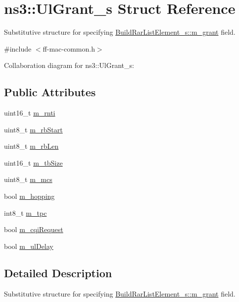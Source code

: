 \hypertarget{structns3_1_1UlGrant__s}{}\section{ns3\+:\+:Ul\+Grant\+\_\+s Struct Reference}
\label{structns3_1_1UlGrant__s}


Substitutive structure for specifying \hyperlink{structns3_1_1BuildRarListElement__s_acd5001d775fe5373d8f5a946faf9eab4}{Build\+Rar\+List\+Element\+\_\+s\+::m\+\_\+grant} field.  




{\ttfamily \#include $<$ff-\/mac-\/common.\+h$>$}



Collaboration diagram for ns3\+:\+:Ul\+Grant\+\_\+s\+:
\subsection*{Public Attributes}
\begin{DoxyCompactItemize}
\item 
uint16\+\_\+t \hyperlink{structns3_1_1UlGrant__s_af84e1341cc3bfe2d93416108b1dce244}{m\+\_\+rnti}
\item 
uint8\+\_\+t \hyperlink{structns3_1_1UlGrant__s_ae1c3bca41e76255179dc453af8db97e4}{m\+\_\+rb\+Start}
\item 
uint8\+\_\+t \hyperlink{structns3_1_1UlGrant__s_ac35c64b333e9d5888d84b0470c7ca23e}{m\+\_\+rb\+Len}
\item 
uint16\+\_\+t \hyperlink{structns3_1_1UlGrant__s_a650f51e5a4548b11974182c895e4c4e4}{m\+\_\+tb\+Size}
\item 
uint8\+\_\+t \hyperlink{structns3_1_1UlGrant__s_acd1128e77e01e05ac5434335d18910de}{m\+\_\+mcs}
\item 
bool \hyperlink{structns3_1_1UlGrant__s_a50d34bde0ad58e8e8858c648fb744e46}{m\+\_\+hopping}
\item 
int8\+\_\+t \hyperlink{structns3_1_1UlGrant__s_a475400b216065aa0e05283ea630d6726}{m\+\_\+tpc}
\item 
bool \hyperlink{structns3_1_1UlGrant__s_a495f2bd48f672718ebdb3ce43df05f56}{m\+\_\+cqi\+Request}
\item 
bool \hyperlink{structns3_1_1UlGrant__s_a2eadbde5725c52bfa735763f2d4310fb}{m\+\_\+ul\+Delay}
\end{DoxyCompactItemize}


\subsection{Detailed Description}
Substitutive structure for specifying \hyperlink{structns3_1_1BuildRarListElement__s_acd5001d775fe5373d8f5a946faf9eab4}{Build\+Rar\+List\+Element\+\_\+s\+::m\+\_\+grant} field. 

